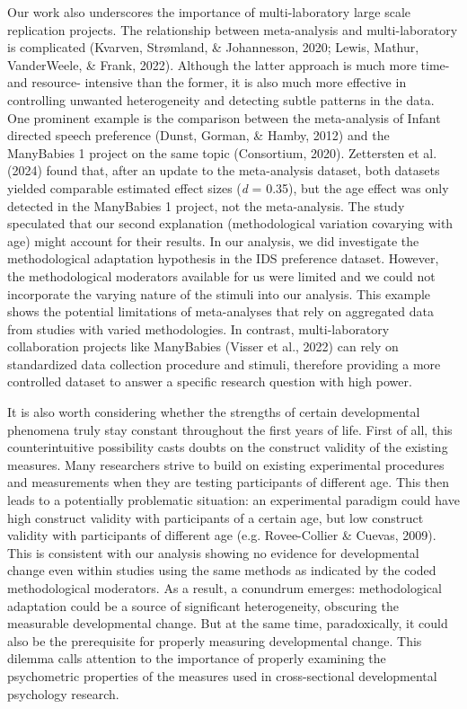 \documentclass[
  man]{apa6}
\begin{document}
Our work also underscores the importance of multi-laboratory large scale replication projects. The relationship between meta-analysis and multi-laboratory is complicated (Kvarven, Strømland, \& Johannesson, 2020; Lewis, Mathur, VanderWeele, \& Frank, 2022). Although the latter approach is much more time- and resource- intensive than the former, it is also much more effective in controlling unwanted heterogeneity and detecting subtle patterns in the data. One prominent example is the comparison between the meta-analysis of Infant directed speech preference (Dunst, Gorman, \& Hamby, 2012) and the ManyBabies 1 project on the same topic (Consortium, 2020). Zettersten et al. (2024) found that, after an update to the meta-analysis dataset, both datasets yielded comparable estimated effect sizes (\emph{d} = 0.35), but the age effect was only detected in the ManyBabies 1 project, not the meta-analysis. The study speculated that our second explanation (methodological variation covarying with age) might account for their results. In our analysis, we did investigate the methodological adaptation hypothesis in the IDS preference dataset. However, the methodological moderators available for us were limited and we could not incorporate the varying nature of the stimuli into our analysis. This example shows the potential limitations of meta-analyses that rely on aggregated data from studies with varied methodologies. In contrast, multi-laboratory collaboration projects like ManyBabies (Visser et al., 2022) can rely on standardized data collection procedure and stimuli, therefore providing a more controlled dataset to answer a specific research question with high power.

It is also worth considering whether the strengths of certain developmental phenomena truly stay constant throughout the first years of life. First of all, this counterintuitive possibility casts doubts on the construct validity of the existing measures. Many researchers strive to build on existing experimental procedures and measurements when they are testing participants of different age. This then leads to a potentially problematic situation: an experimental paradigm could have high construct validity with participants of a certain age, but low construct validity with participants of different age (e.g. Rovee-Collier \& Cuevas, 2009). This is consistent with our analysis showing no evidence for developmental change even within studies using the same methods as indicated by the coded methodological moderators. As a result, a conundrum emerges: methodological adaptation could be a source of significant heterogeneity, obscuring the measurable developmental change. But at the same time, paradoxically, it could also be the prerequisite for properly measuring developmental change. This dilemma calls attention to the importance of properly examining the psychometric properties of the measures used in cross-sectional developmental psychology research.
\end{document}
